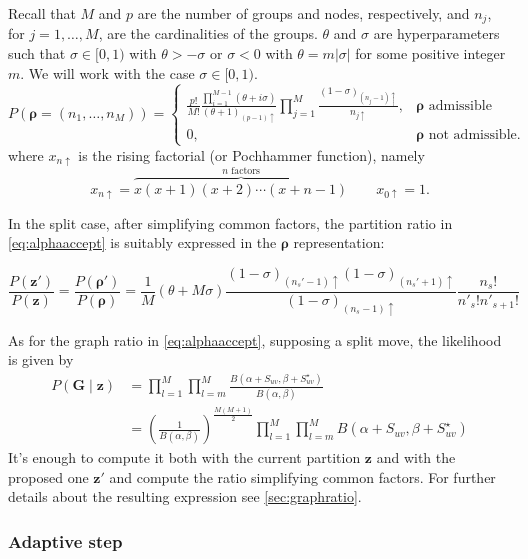 Recall that $M$ and $p$ are the number of groups and nodes, respectively, and $n_{j}$, for $j=1,\ldots,M$, are the cardinalities of the groups.
$\theta$ and $\sigma$ are hyperparameters such that $\sigma\in[0,1)$ with $\theta>-\sigma$ or $\sigma<0$ with $\theta=m|\sigma|$ for some positive integer $m$. We will work with the case $\sigma\in[0,1)$.
\[
    P(\bm{\rho} = (n_1, \ldots, n_M))
    =
    \begin{cases}
        \frac{p!}{M!} \frac{ \prod_{i=1}^{M-1}{(\theta +i\sigma)} }{(\theta+1)_{(p-1)\uparrow}} \prod_{j=1}^{M}{\frac{(1-\sigma)_{(n_{j}-1)\uparrow}}{n_{j\uparrow}} }, & \bm{\rho} \text{ admissible}\\
                0, & \bm{\rho} \text{ not admissible.}
    \end{cases}
\]
where $x_{n\uparrow}$ is the rising factorial (or Pochhammer function), namely
\begin{equation*}
x_{n\uparrow} = \overbrace{x(x+1)(x+2)\cdots(x+n-1)}^{n\text{ factors}} \qquad x_{0\uparrow}=1.
\end{equation*}

In the split case, after simplifying common factors, the partition ratio in \eqref{eq:alphaaccept} is suitably expressed in the $\bm{\rho}$ representation:

\begin{equation*}
    \frac{P(\bm{z}')}{P(\bm{z})}
    =
    \frac{P(\bm{\rho}')}{P(\bm{\rho})}
    =
    \frac{1}{M}(\theta+M\sigma)\frac{(1-\sigma)_{(n_{s}'-1)\uparrow}(1-\sigma)_{(n_{s}'+1)\uparrow}}{(1-\sigma)_{(n_{s}-1)\uparrow}}\frac{n_{s}!}{n'_{s}!n'_{s+1}!}
\end{equation*}


As for the graph ratio in \eqref{eq:alphaaccept}, supposing a split move, the likelihood is given by
\begin{align*}
    P(\bm{G}\mid \bm{z}) &= \prod_{l=1}^M \prod_{l=m}^M \frac{B(\alpha+S_{uv},\beta+S^{\star}_{uv})}{B(\alpha,\beta)} \\
    &= \left(\frac{1}{B(\alpha,\beta)}\right)^\frac{M(M+1)}{2}\prod_{l=1}^M \prod_{l=m}^M B(\alpha+S_{uv},\beta+S^{\star}_{uv})
\end{align*}
It's enough to compute it both with the current partition $\bm{z}$ and with the proposed one $\bm{z}'$ and compute the ratio simplifying common factors. For further details about the resulting expression see \ref{sec:graphratio}.

\subsubsection{Adaptive step}

